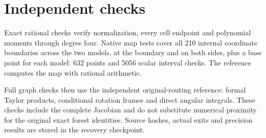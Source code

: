 \documentclass[11pt]{article}
\begin{document}
\section*{Independent checks}
Exact rational checks verify normalization, every cell endpoint and polynomial
moments through degree four. Native map tests cover all 210 internal
coordinate boundaries across the two models, at the boundary and on both
sides, plus a base point for each model: 632 points and 5056 scalar interval
checks. The reference computes the map with rational arithmetic.

Full graph checks then use the independent original-routing reference:
formal Taylor products, conditional rotation frames and direct angular
integrals. These checks include the complete Jacobian and do not substitute
numerical proximity for the original exact forest identities. Source hashes,
actual exits and precision results are stored in the recovery checkpoint.
\end{document}
